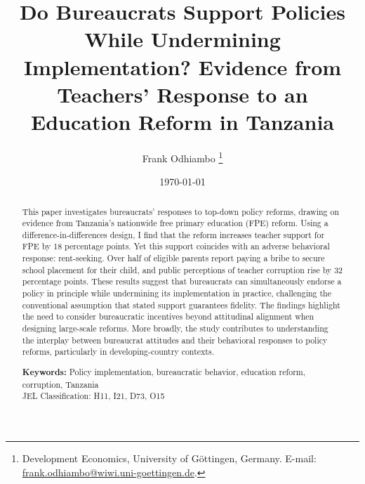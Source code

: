 \documentclass[hidelinks,12pt]{article}
\begin{document}
\begin{singlespace}

\begin{titlepage}
\title{Do Bureaucrats Support Policies While Undermining Implementation? Evidence from Teachers’ Response to an Education Reform in Tanzania}

\author{Frank Odhiambo \thanks{Development Economics, University of G\"ottingen, Germany. E-mail: \href{mailto:frank.odhiambo@wiwi.uni-goettingen.de}{frank.odhiambo@wiwi.uni-goettingen.de}.}}

\date{\today}
\maketitle
\begin{abstract}
\begin{singlespace}
This paper investigates bureaucrats’ responses to top-down policy reforms, drawing on evidence from Tanzania’s nationwide free primary education (FPE) reform. Using a difference-in-differences design, I find that the reform increases teacher support for FPE by 18 percentage points. Yet this support coincides with an adverse behavioral response: rent-seeking. Over half of eligible parents report paying a bribe to secure school placement for their child, and public perceptions of teacher corruption rise by 32 percentage points. These results suggest that bureaucrats can simultaneously endorse a policy in principle while undermining its implementation in practice, challenging the conventional assumption that stated support guarantees fidelity. The findings highlight the need to consider bureaucratic incentives beyond attitudinal alignment when designing large-scale reforms. More broadly, the study contributes to understanding the interplay between bureaucrat attitudes and their behavioral responses to policy reforms, particularly in developing-country contexts.\\
\end{singlespace}

\textbf{Keywords:} Policy implementation, bureaucratic behavior, education reform, corruption, Tanzania \\

JEL Classification: H11, I21, D73, O15

\bigskip
\end{abstract}
\setcounter{page}{0}
\thispagestyle{empty}
\end{titlepage}
\pagebreak \newpage


\end{singlespace}
\end{document}
